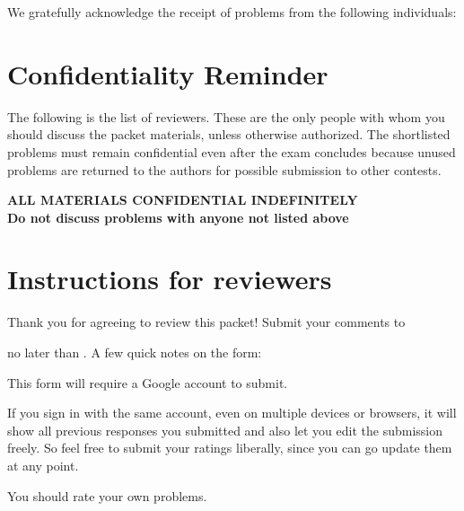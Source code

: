 \maketitle %

We gratefully acknowledge the receipt of \numreceived{}
problems from the following individuals:
\begin{quote}
\large \thankedauthors
\end{quote}

\tableofcontents

\chapter*{Confidentiality Reminder}
The following is the list of reviewers.
These are the only people with whom you should discuss
the packet materials, unless otherwise authorized.
The shortlisted problems must remain confidential
even after the exam concludes because unused problems are returned
to the authors for possible submission to other contests.

\vspace{1em}


\vfill
\begin{mdframed}
  \begin{center}
    \bfseries
    \Large
    { \color{blue} ALL MATERIALS CONFIDENTIAL INDEFINITELY} \\[1em]
    Do not discuss problems with anyone not listed above
  \end{center}
\end{mdframed}
\vspace{1.5em}

\pagebreak

\chapter{Instructions for reviewers}
Thank you for agreeing to review this packet!
Submit your comments to
\begin{center}
  \submitURL
\end{center}
no later than \alert{\deadline}.
A few quick notes on the form:
\begin{itemize}
\ii This form will require a Google account to submit.

\ii If you sign in with the same account, even on multiple devices
or browsers, it will show all previous responses you submitted
and also let you edit the submission freely.
So feel free to submit your ratings liberally,
since you can go update them at any point.

\ii You should rate your own problems.
\end{itemize}

